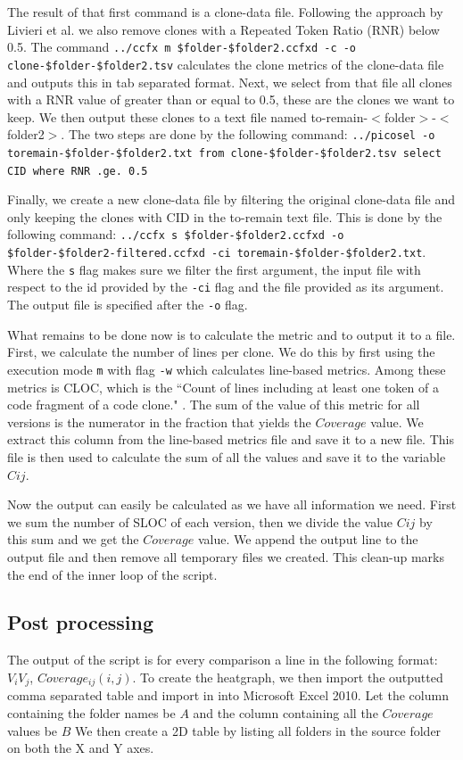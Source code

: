 \documentclass[a4paper,twoside, twocolumn, 11pt]{article}
\numberwithin{equation}{section}
\begin{document}
The result of that first command is a clone-data file. Following the approach by Livieri et al. we also remove clones with a Repeated Token Ratio (RNR) below 0.5. 
The command \texttt{../ccfx m \$folder-\$folder2.ccfxd -c -o clone-\$folder-\$folder2.tsv} calculates the clone metrics of the clone-data file and outputs this in tab separated format. 
Next, we select from that file all clones with a RNR value of greater than or equal to 0.5, these are the clones we want to keep. 
We then output these clones to a text file named to-remain-$<$folder$>$-$<$folder2$>$. 
The two steps are done by the following command: \texttt{../picosel -o toremain-\$folder-\$folder2.txt from clone-\$folder-\$folder2.tsv select CID where RNR .ge. 0.5}

Finally, we create a new clone-data file by filtering the original clone-data file and only keeping the clones with CID in the to-remain text file.
This is done by the following command: \texttt{../ccfx s \$folder-\$folder2.ccfxd -o \$folder-\$folder2-filtered.ccfxd -ci toremain-\$folder-\$folder2.txt}.
Where the \texttt{s} flag makes sure we filter the first argument, the input file with respect to the id provided by the \texttt{-ci} flag and the file provided as its argument.
The output file is specified after the \texttt{-o} flag.

What remains to be done now is to calculate the metric and to output it to a file.
First, we calculate the number of lines per clone.
We do this by first using the execution mode \texttt{m} with flag \texttt{-w} which calculates line-based metrics.
Among these metrics is CLOC, which is the ``Count of lines including at least one token of a code fragment of a code clone." \cite{gemx tutorial}.
The sum of the value of this metric for all versions is the numerator in the fraction that yields the $Coverage$ value.
We extract this column from the line-based metrics file and save it to a new file.
This file is then used to calculate the sum of all the values and save it to the variable $Cij$.

Now the output can easily be calculated as we have all information we need. 
First we sum the number of SLOC of each version, then we divide the value $Cij$ by this sum and we get the $Coverage$ value.
We append the output line to the output file and then remove all temporary files we created.
This clean-up marks the end of the inner loop of the script.

\subsection{Post processing}
The output of the script is for every comparison a line in the following format: $V_iV_j$, $Coverage_{ij}(i,j)$.
To create the heatgraph, we then import the outputted comma separated table and import in into Microsoft Excel 2010.
Let the column containing the folder names be $A$ and the column containing all the $Coverage$ values be $B$
We then create a 2D table by listing all folders in the source folder on both the X and Y axes.
\end{document}
